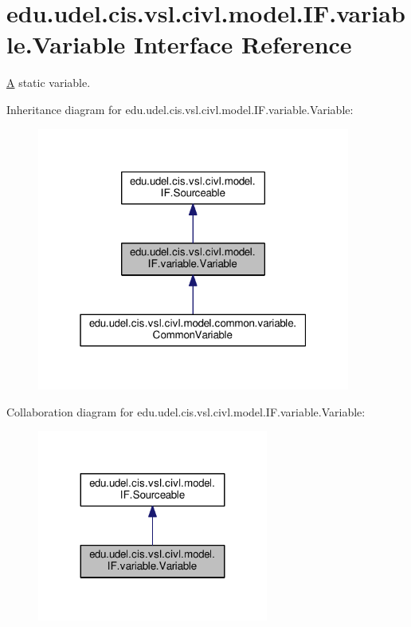\hypertarget{interfaceedu_1_1udel_1_1cis_1_1vsl_1_1civl_1_1model_1_1IF_1_1variable_1_1Variable}{}\section{edu.\+udel.\+cis.\+vsl.\+civl.\+model.\+I\+F.\+variable.\+Variable Interface Reference}
\label{interfaceedu_1_1udel_1_1cis_1_1vsl_1_1civl_1_1model_1_1IF_1_1variable_1_1Variable}


\hyperlink{structA}{A} static variable.  




Inheritance diagram for edu.\+udel.\+cis.\+vsl.\+civl.\+model.\+I\+F.\+variable.\+Variable\+:
\nopagebreak
\begin{figure}[H]
\begin{center}
\leavevmode
\includegraphics[width=292pt]{interfaceedu_1_1udel_1_1cis_1_1vsl_1_1civl_1_1model_1_1IF_1_1variable_1_1Variable__inherit__graph}
\end{center}
\end{figure}


Collaboration diagram for edu.\+udel.\+cis.\+vsl.\+civl.\+model.\+I\+F.\+variable.\+Variable\+:
\nopagebreak
\begin{figure}[H]
\begin{center}
\leavevmode
\includegraphics[width=215pt]{interfaceedu_1_1udel_1_1cis_1_1vsl_1_1civl_1_1model_1_1IF_1_1variable_1_1Variable__coll__graph}
\end{center}
\end{figure}
